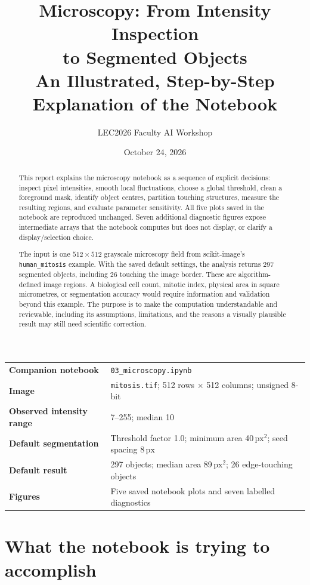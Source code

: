 \documentclass[11pt,letterpaper]{article}
\title{\textbf{Microscopy: From Intensity Inspection\\to Segmented Objects}\\[7pt]
  \large An Illustrated, Step-by-Step Explanation of the Notebook}
\author{LEC2026 Faculty AI Workshop}
\date{October 24, 2026}
\newcommand{\field}[1]{\nolinkurl{#1}}
\newcommand{\px}{\ensuremath{\mathrm{px}}}
\newcommand{\pxsq}{\ensuremath{\mathrm{px}^{2}}}
\begin{document}
\maketitle
\thispagestyle{empty}
\begin{abstract}
This report explains the microscopy notebook as a sequence of explicit decisions: inspect pixel intensities, smooth local fluctuations, choose a global threshold, clean a foreground mask, identify object centres, partition touching structures, measure the resulting regions, and evaluate parameter sensitivity. All five plots saved in the notebook are reproduced unchanged. Seven additional diagnostic figures expose intermediate arrays that the notebook computes but does not display, or clarify a display/selection choice.

The input is one $512\times512$ grayscale microscopy field from scikit-image's \field{human_mitosis} example. With the saved default settings, the analysis returns 297 segmented objects, including 26 touching the image border. These are algorithm-defined image regions. A biological cell count, mitotic index, physical area in square micrometres, or segmentation accuracy would require information and validation beyond this example. The purpose is to make the computation understandable and reviewable, including its assumptions, limitations, and the reasons a visually plausible result may still need scientific correction.
\end{abstract}

\begin{center}\small
\begin{tabular}{ll}
\toprule
\textbf{Companion notebook} & \field{03_microscopy.ipynb} \\
\textbf{Image} & \field{mitosis.tif}; 512 rows $\times$ 512 columns; unsigned 8-bit \\
\textbf{Observed intensity range} & 7--255; median 10 \\
\textbf{Default segmentation} & Threshold factor 1.0; minimum area 40\,\pxsq; seed spacing 8\,\px \\
\textbf{Default result} & 297 objects; median area 89\,\pxsq; 26 edge-touching objects \\
\textbf{Figures} & Five saved notebook plots and seven labelled diagnostics \\
\bottomrule
\end{tabular}
\end{center}
\clearpage
\tableofcontents
\clearpage

\section{What the notebook is trying to accomplish}
\end{document}
